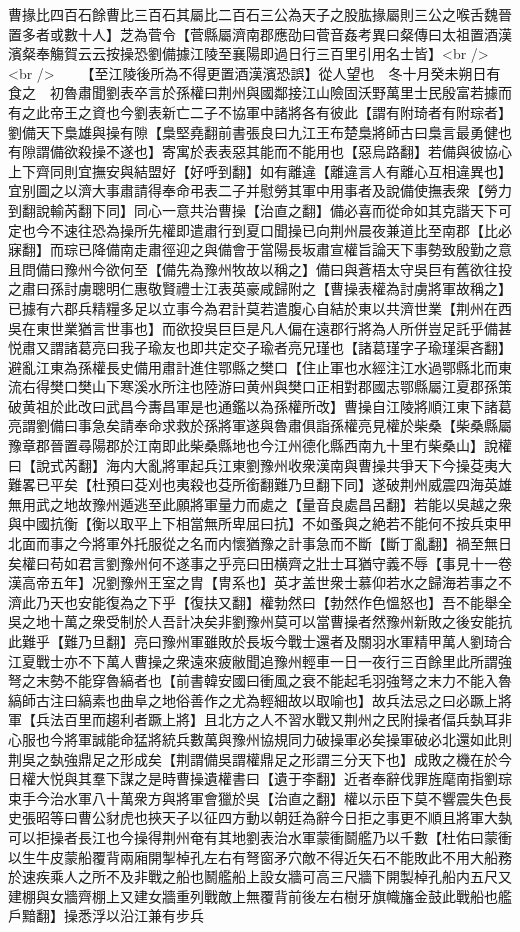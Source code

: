 曹掾比四百石餘曹比三百石其屬比二百石三公為天子之股肱掾屬則三公之喉舌魏晉置多者或數十人】芝為菅令【菅縣屬濟南郡應劭曰菅音姦考異曰粲傳曰太祖置酒漢濱粲奉觴賀云云按操恐劉備據江陵至襄陽即過日行三百里引用名士皆】<br />
<br />
　　【至江陵後所為不得更置酒漢濱恐誤】從人望也　冬十月癸未朔日有食之　初魯肅聞劉表卒言於孫權曰荆州與國鄰接江山險固沃野萬里士民殷富若據而有之此帝王之資也今劉表新亡二子不協軍中諸將各有彼此【謂有附琦者有附琮者】劉備天下梟雄與操有隙【梟堅堯翻前書張良曰九江王布楚梟將師古曰梟言最勇健也有隙謂備欲殺操不遂也】寄寓於表表惡其能而不能用也【惡烏路翻】若備與彼協心上下齊同則宜撫安與結盟好【好呼到翻】如有離違【離違言人有離心互相違異也】宜别圖之以濟大事肅請得奉命弔表二子并慰勞其軍中用事者及說備使撫表衆【勞力到翻說輸芮翻下同】同心一意共治曹操【治直之翻】備必喜而從命如其克諧天下可定也今不速往恐為操所先權即遣肅行到夏口聞操已向荆州晨夜兼道比至南郡【比必寐翻】而琮已降備南走肅徑迎之與備會于當陽長坂肅宣權旨論天下事勢致殷勤之意且問備曰豫州今欲何至【備先為豫州牧故以稱之】備曰與蒼梧太守吳巨有舊欲往投之肅曰孫討虜聰明仁惠敬賢禮士江表英豪咸歸附之【曹操表權為討虜將軍故稱之】已據有六郡兵精糧多足以立事今為君計莫若遣腹心自結於東以共濟世業【荆州在西吳在東世業猶言世事也】而欲投吳巨巨是凡人偏在遠郡行將為人所併豈足託乎備甚悦肅又謂諸葛亮曰我子瑜友也即共定交子瑜者亮兄瑾也【諸葛瑾字子瑜瑾渠吝翻】避亂江東為孫權長史備用肅計進住鄂縣之樊口【住止軍也水經注江水過鄂縣北而東流右得樊口樊山下寒溪水所注也陸游曰黄州與樊口正相對郡國志鄂縣屬江夏郡孫策破黄祖於此改曰武昌今夀昌軍是也通鑑以為孫權所改】曹操自江陵將順江東下諸葛亮謂劉備曰事急矣請奉命求救於孫將軍遂與魯肅俱詣孫權亮見權於柴桑【柴桑縣屬豫章郡晉置尋陽郡於江南即此柴桑縣地也今江州德化縣西南九十里冇柴桑山】說權曰【說式芮翻】海内大亂將軍起兵江東劉豫州收衆漢南與曹操共爭天下今操芟夷大難畧已平矣【杜預曰芟刈也夷殺也芟所銜翻難乃旦翻下同】遂破荆州威震四海英雄無用武之地故豫州遁逃至此願將軍量力而處之【量音良處昌呂翻】若能以吳越之衆與中國抗衡【衡以取平上下相當無所卑屈曰抗】不如蚤與之絶若不能何不按兵束甲北面而事之今將軍外托服從之名而内懷猶豫之計事急而不斷【斷丁亂翻】禍至無日矣權曰苟如君言劉豫州何不遂事之乎亮曰田横齊之壯士耳猶守義不辱【事見十一卷漢高帝五年】况劉豫州王室之胄【冑系也】英才盖世衆士慕仰若水之歸海若事之不濟此乃天也安能復為之下乎【復扶又翻】權勃然曰【勃然作色慍怒也】吾不能舉全吳之地十萬之衆受制於人吾計决矣非劉豫州莫可以當曹操者然豫州新敗之後安能抗此難乎【難乃旦翻】亮曰豫州軍雖敗於長坂今戰士還者及關羽水軍精甲萬人劉琦合江夏戰士亦不下萬人曹操之衆遠來疲敝聞追豫州輕車一日一夜行三百餘里此所謂強弩之末勢不能穿魯縞者也【前書韓安國曰衝風之衰不能起毛羽強弩之末力不能入魯縞師古注曰縞素也曲阜之地俗善作之尤為輕細故以取喻也】故兵法忌之曰必蹶上將軍【兵法百里而趨利者蹶上將】且北方之人不習水戰又荆州之民附操者偪兵埶耳非心服也今將軍誠能命猛將統兵數萬與豫州協規同力破操軍必矣操軍破必北還如此則荆吳之埶強鼎足之形成矣【荆謂備吳謂權鼎足之形謂三分天下也】成敗之機在於今日權大悦與其羣下謀之是時曹操遺權書曰【遺于李翻】近者奉辭伐罪旌麾南指劉琮束手今治水軍八十萬衆方與將軍會獵於吳【治直之翻】權以示臣下莫不響震失色長史張昭等曰曹公豺虎也挾天子以征四方動以朝廷為辭今日拒之事更不順且將軍大埶可以拒操者長江也今操得荆州奄有其地劉表治水軍蒙衝鬬艦乃以千數【杜佑曰蒙衝以生牛皮蒙船覆背兩廂開掣棹孔左右有弩窗矛穴敵不得近矢石不能敗此不用大船務於速疾乘人之所不及非戰之船也鬭艦船上設女牆可高三尺牆下開製棹孔船内五尺又建棚與女牆齊棚上又建女牆重列戰敵上無覆背前後左右樹牙旗幟旛金鼓此戰船也艦戶黯翻】操悉浮以沿江兼有步兵